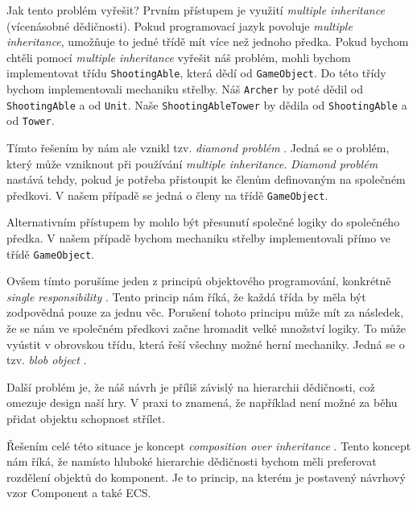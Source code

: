
Jak tento problém vyřešit? Prvním přístupem je využití \textit{multiple inheritance}  (vícenásobné dědičnosti). Pokud programovací jazyk povoluje \textit{multiple inheritance}, umožňuje to jedné třídě mít více než jednoho předka. Pokud bychom chtěli pomocí \textit{multiple inheritance} vyřešit náš problém, mohli bychom implementovat třídu \verb|ShootingAble|, která dědí od \verb|GameObject|. Do této třídy bychom implementovali mechaniku střelby. Náš \verb|Archer| by poté dědil od \verb|ShootingAble| a od \verb|Unit|. Naše \verb|ShootingAbleTower| by dědila od \verb|ShootingAble| a od \verb|Tower|.


Tímto řešením by nám ale vznikl tzv. \textit{diamond problém} . Jedná se o problém, který může vzniknout při používání \textit{multiple inheritance}. \textit{Diamond problém} nastává tehdy, pokud je potřeba přistoupit ke členům definovaným na společném předkovi. V našem případě se jedná o členy na třídě \verb|GameObject|.

Alternativním přístupem by mohlo být přesunutí společné logiky do společného předka. V našem případě bychom mechaniku střelby implementovali přímo ve třídě \verb|GameObject|.

Ovšem tímto porušíme jeden z principů objektového programování, konkrétně \textit{single responsibility} . Tento princip nám říká, že každá třída by měla být zodpovědná pouze za jednu věc. Porušení tohoto principu může mít za následek, že se nám ve společném předkovi začne hromadit velké množství logiky. To může vyústit v obrovskou třídu, která řeší všechny možné herní mechaniky. Jedná se o tzv. \textit{blob object} . 

Další problém je, že náš návrh je příliš závislý na hierarchii dědičnosti, což omezuje design naší hry. V praxi to znamená, že například není možné za běhu přidat objektu schopnost střílet.

Řešením celé této situace je koncept \textit{composition over inheritance} . Tento koncept nám říká, že namísto hluboké hierarchie dědičnosti bychom měli preferovat rozdělení objektů do komponent. Je to princip, na kterém je postavený návrhový vzor Component a také ECS.


